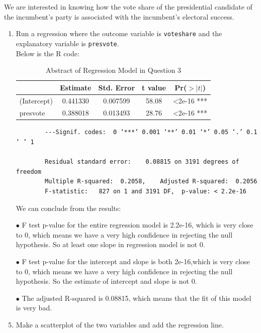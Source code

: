 \documentclass[12pt,letterpaper]{article}
\begin{document}
\noindent We are interested in knowing how the vote share of the presidential candidate of the incumbent's party is associated with the incumbent's electoral success.
	\vspace{.25cm}
	\begin{enumerate}
		\item Run a regression where the outcome variable is \texttt{voteshare} and the explanatory variable is \texttt{presvote}. \\
		
		Below is the R code:
		
		
		\begin{table}[ht]
			\centering
			\caption{Abstract of Regression Model in Question 3}
			\begin{tabular}{lcccc}
				\toprule
				& Estimate & Std. Error & t value & Pr($>|t|$) \\
				\midrule
				(Intercept) & 0.441330 &0.007599 & 58.08 & <2e-16 *** \\
				presvote & 0.388018 & 0.013493 & 28.76 & <2e-16 *** \\
				\bottomrule
			\end{tabular} 
		\end{table}
		\begin{verbatim}
		---Signif. codes:  0 ‘***’ 0.001 ‘**’ 0.01 ‘*’ 0.05 ‘.’ 0.1 ‘ ’ 1
		
		Residual standard error: 	0.08815 on 3191 degrees of freedom
		Multiple R-squared:  0.2058,	Adjusted R-squared:  0.2056 
		F-statistic:   827 on 1 and 3191 DF,  p-value: < 2.2e-16
		\end{verbatim}
		We can conclude from the results:
		\item[$\bullet$] F test p-value for the entire regression model is 2.2e-16, which is very close to 0, which means we have a very high confidence in rejecting the null hypothesis. So at least one slope in regression model is not 0.
		\item[$\bullet$] F test p-value for the intercept and slope is both 2e-16,which is very close to 0, which means we have a very high confidence in rejecting the null hypothesis. So the estimate of intercept and slope is not 0.
		\item[$\bullet$] The adjusted R-squared is 0.08815, which means that the fit of this model is very bad.
		
		\newpage
		
		\item Make a scatterplot of the two variables and add the regression line. 
		

\end{enumerate}
\end{document}
